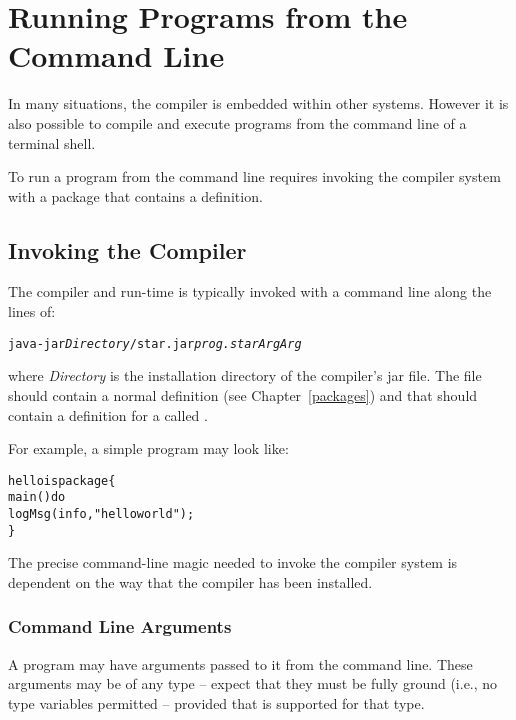 \chapter{Running Programs from the Command Line}
\label{commandLineRunning}

In many situations, the \Sr compiler is embedded within other systems. However it is also possible to compile and execute \Sr programs from the command line of a terminal shell.

\label{commandLine}
To run a program from the command line requires invoking the \Sr compiler system with a package that contains a  definition.

\section{Invoking the \Sr Compiler}
The \Sr compiler and run-time is typically invoked with a command line along the lines of:
\begin{alltt}
java -jar \emph{Directory}/star.jar \emph{prog.star} \emph{Arg}\sequence{\quad}\emph{Arg\subn}
\end{alltt}
where \emph{Directory} is the installation directory of the \Sr compiler's jar file. The  file  should contain a normal  definition (see Chapter~\vref{packages}) and that  should contain a definition for a  called .

For example, a simple  program may look like:
\begin{alltt}
hello is package\{
  main() do 
    logMsg(info,"hello world");
\}
\end{alltt}

\begin{aside}
The precise command-line magic needed to invoke the \Sr compiler system is dependent on the way that the \Sr compiler has been installed.
\end{aside}

\subsection{Command Line Arguments}
\label{commandLineArgs}

A \Sr {} program may have arguments passed to it from the command line. These arguments may be of any type -- expect that they must be fully ground (i.e., no type variables permitted -- provided that  is supported for that type.

